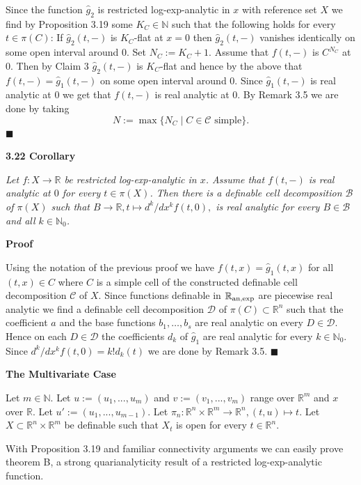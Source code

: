 \documentclass[12pt]{article}
\def\vs{\vspace}
\def\ma{\mathcal}
\begin{document}
\vs{0.4cm}
Since the function $\hat{g}_2$ is restricted log-exp-analytic in $x$ with reference set $X$ we find by Proposition 3.19 some $K_C \in \mathbb{N}$ such that the following holds for every $t \in \pi(C)$: If $\hat{g}_2(t,-)$ is $K_C$-flat at $x=0$ then $\hat{g}_2(t,-)$ vanishes identically on some open interval around $0$. Set $N_C:=K_C+1$. Assume that $f(t,-)$ is $C^{N_C}$ at $0$. Then by Claim $3$ $\hat{g}_2(t,-)$ is $K_C$-flat and hence by the above that $f(t,-)=\hat{g}_1(t,-)$ on some open interval around $0$. Since $\hat{g}_1(t,-)$ is real analytic at $0$ we get that $f(t,-)$ is real analytic at $0$. By Remark 3.5 we are done by taking 
$$N:=\max\{N_C\mid C\in \ma{C}\mbox{ simple}\}.$$
\hfill$\blacksquare$

\vs{0.3cm}
{\bf3.22 Corollary}

\vs{0.1cm}
{\it Let $f:X \to \mathbb{R}$ be restricted log-exp-analytic in $x$. Assume that $f(t,-)$ is real analytic at $0$ for every $t \in \pi(X)$. Then there is a definable cell decomposition $\mathcal{B}$ of $\pi(X)$ such that $B \to \mathbb{R}, t \mapsto d^k/dx^k f(t,0),$ is real analytic for every $B \in \mathcal{B}$ and all $k \in \mathbb{N}_0$.}

\vs{0.4cm}
{\bf Proof}

\vs{0.1cm}
Using the notation of the previous proof we have $f(t,x)=\hat{g}_1(t,x)$ for all $(t,x)\in C$ where $C$ is a simple cell of the constructed definable cell decomposition $\mathcal{C}$ of $X$. Since functions definable in $\mathbb{R}_{\textnormal{an,exp}}$ are piecewise real analytic we find a definable cell decomposition $\mathcal{D}$ of $\pi(C) \subset \mathbb{R}^n$ such that the coefficient $a$ and the base functions $b_1,\ldots,b_s$ are real analytic on every $D \in \mathcal{D}$. Hence on each $D \in \mathcal{D}$ the coefficients $d_k$ of $\hat{g}_1$ are real analytic for every $k \in \mathbb{N}_0$.
Since $d^k/dx^k f(t,0)=k! d_k(t)$ we are done by Remark 3.5.
\hfill$\blacksquare$

\vs{1cm}
{\bf The Multivariate Case}

\vs{0.3cm}
Let $m \in \mathbb{N}$. Let $u:=(u_1,...,u_m)$ and $v:=(v_1,...,v_m)$ range over $\mathbb{R}^m$ and $x$ over $\mathbb{R}$. Let $u':=(u_1,...,u_{m-1})$. Let $\pi_n:\mathbb{R}^n \times \mathbb{R}^m \to \mathbb{R}^n ,(t,u) \mapsto t$. Let $X \subset \mathbb{R}^n \times \mathbb{R}^m$ be definable such that $X_t$ is open for every $t \in \mathbb{R}^n$.

\vs{0.5cm}
With Proposition 3.19 and familiar connectivity arguments we can easily prove theorem B, a strong quarianalyticity result of a restricted log-exp-analytic function.
\end{document}
